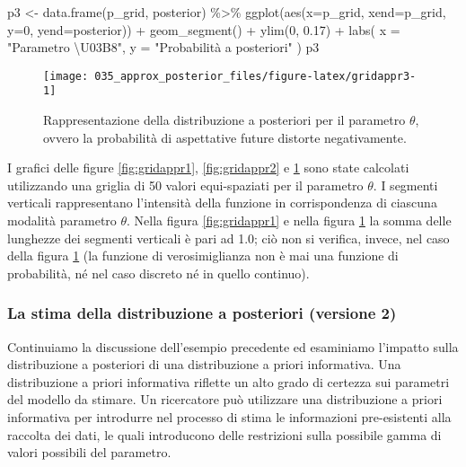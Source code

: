\documentclass[
]{memoir}
\newenvironment{Shaded}{\begin{snugshade}}{\end{snugshade}}
\newcommand{\AttributeTok}[1]{\textcolor[rgb]{0.77,0.63,0.00}{#1}}
\newcommand{\DecValTok}[1]{\textcolor[rgb]{0.00,0.00,0.81}{#1}}
\newcommand{\FloatTok}[1]{\textcolor[rgb]{0.00,0.00,0.81}{#1}}
\newcommand{\FunctionTok}[1]{\textcolor[rgb]{0.00,0.00,0.00}{#1}}
\newcommand{\NormalTok}[1]{#1}
\newcommand{\OtherTok}[1]{\textcolor[rgb]{0.56,0.35,0.01}{#1}}
\newcommand{\SpecialCharTok}[1]{\textcolor[rgb]{0.00,0.00,0.00}{#1}}
\newcommand{\StringTok}[1]{\textcolor[rgb]{0.31,0.60,0.02}{#1}}
\begin{document}
\begin{Shaded}
\begin{Highlighting}[]
\NormalTok{p3 }\OtherTok{\textless{}{-}} \FunctionTok{data.frame}\NormalTok{(p\_grid, posterior) }\SpecialCharTok{\%\textgreater{}\%}
  \FunctionTok{ggplot}\NormalTok{(}\FunctionTok{aes}\NormalTok{(}\AttributeTok{x=}\NormalTok{p\_grid, }\AttributeTok{xend=}\NormalTok{p\_grid, }\AttributeTok{y=}\DecValTok{0}\NormalTok{, }\AttributeTok{yend=}\NormalTok{posterior)) }\SpecialCharTok{+}
  \FunctionTok{geom\_segment}\NormalTok{() }\SpecialCharTok{+}
  \FunctionTok{ylim}\NormalTok{(}\DecValTok{0}\NormalTok{, }\FloatTok{0.17}\NormalTok{) }\SpecialCharTok{+}
  \FunctionTok{labs}\NormalTok{(}
    \AttributeTok{x =} \StringTok{"Parametro \textbackslash{}U03B8"}\NormalTok{,}
    \AttributeTok{y =} \StringTok{"Probabilità a posteriori"}
\NormalTok{  )}
\NormalTok{p3}
\end{Highlighting}
\end{Shaded}

\begin{figure}

{\centering \texttt{[image: 035\_approx\_posterior\_files/figure-latex/gridappr3-1]} 

}

\caption{Rappresentazione della distribuzione a posteriori per il parametro $\theta$, ovvero la probabilità di aspettative future distorte negativamente.}\label{fig:gridappr3}
\end{figure}

I grafici delle figure \ref{fig:gridappr1}, \ref{fig:gridappr2} e \ref{fig:gridappr3} sono state calcolati utilizzando una griglia di 50 valori equi-spaziati per il parametro \(\theta\). I segmenti verticali rappresentano l'intensità della funzione in corrispondenza di ciascuna modalità parametro \(\theta\). Nella figura \ref{fig:gridappr1} e nella figura \ref{fig:gridappr3} la somma delle lunghezze dei segmenti verticali è pari ad 1.0; ciò non si verifica, invece, nel caso della figura \ref{fig:gridappr3} (la funzione di verosimiglianza non è mai una funzione di probabilità, né nel caso discreto né in quello continuo).

\hypertarget{es-depression-beta-2-10}{%
\subsubsection{La stima della distribuzione a posteriori (versione 2)}\label{es-depression-beta-2-10}}

Continuiamo la discussione dell'esempio precedente ed esaminiamo l'impatto sulla distribuzione a posteriori di una distribuzione a priori informativa. Una distribuzione a priori informativa riflette un alto grado di certezza sui parametri del modello da stimare. Un ricercatore può utilizzare una distribuzione a priori informativa per introdurre nel processo di stima le informazioni pre-esistenti alla raccolta dei dati, le quali introducono delle restrizioni sulla possibile gamma di valori possibili del parametro.
\end{document}
